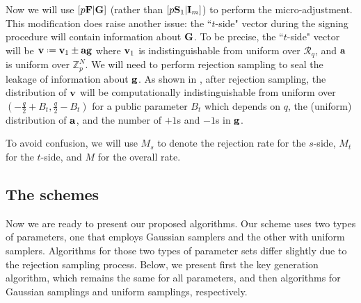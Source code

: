 \documentclass{llncs}
\newcommand{\Rcal}{{\mathcal R}}
\newcommand{\ZZ}{\mathbb{Z}}
\newcommand{\bfa}{{\bf a}}
\newcommand{\bfb}{{\bf b}}
\newcommand{\bff}{{\bf f}}
\newcommand{\bfg}{{\bf g}}
\newcommand{\bfr}{{\bf r}}
\newcommand{\bfv}{{\bf v}}
\newcommand{\bfF}{{\bf F}}
\newcommand{\bfG}{{\bf G}}
\newcommand{\bfI}{{\bf I}}
\newcommand{\bfS}{{\bf S}}
\newcommand{\<}{\langle}
\renewcommand{\>}{\rangle}
\newcommand*{\defeq}{\mathrel{\vcenter{\baselineskip0.5ex \lineskiplimit0pt
                     \hbox{\scriptsize.}\hbox{\scriptsize.}}}%
                     =}
\begin{document}
%
Now we will use  $[p\bfF|\bfG]$ (rather 
than $[p\bfS_1|\bfI_m]$) to perform the micro-adjustment.
This modification does raise another issue: 
the ``$t$-side" vector during the signing procedure will contain
information about $\bfG$. To be precise, 
the ``$t$-side" vector will be $\bfv\defeq \bfv_1\pm\bfa\bfg$ where 
$\bfv_1$ is indistinguishable from uniform over $\Rcal_q$, and $\bfa$
is uniform over $\ZZ_p^N$.
We will need to perform 
rejection sampling to seal the leakage of information about $\bfg$. As shown in 
\cite{DBLP:conf/pqcrypto/HoffsteinPSSW14}, after rejection sampling,
the distribution of 
$\bfv $ will be computationally indistinguishable from uniform over $(-\frac{q}{2}+B_t, \frac{q}{2}-B_t)$
for a public parameter $B_t$ which depends on $q$,  the (uniform) distribution of $\bfa$, and the number of $+1$s and $-1$s in $\bfg$.



To avoid confusion, we will use $M_s$ to denote the rejection rate for
the $s$-side, $M_t$ for the $t$-side, and $M$ for the overall rate.

\subsection{The schemes}
Now we are ready to present our proposed algorithms. Our scheme uses two
types of parameters, one that employs Gaussian samplers and the other with
uniform samplers. Algorithms for those two types of parameter sets 
differ slightly due to the rejection sampling process. Below, we 
present first the key generation algorithm, which remains the same for
all parameters, and then algorithms for Gaussian samplings and uniform
samplings, respectively.
\end{document}
